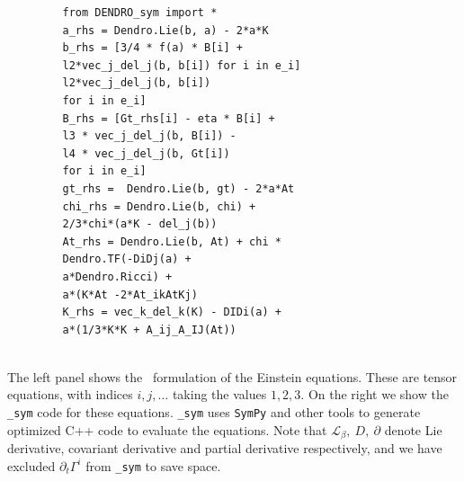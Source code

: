 \documentclass[landscape]{a0poster}
\begin{document}
\begin{textblock}{32}
\begin{textblock}{14.3}
\begin{figure}
\begin{minipage}[t]{.5\textwidth}
\begin{verbatim}
   from DENDRO_sym import *
   a_rhs = Dendro.Lie(b, a) - 2*a*K
   b_rhs = [3/4 * f(a) * B[i] + 
   l2*vec_j_del_j(b, b[i]) for i in e_i]
   l2*vec_j_del_j(b, b[i]) 
   for i in e_i]
   B_rhs = [Gt_rhs[i] - eta * B[i] + 
   l3 * vec_j_del_j(b, B[i]) - 
   l4 * vec_j_del_j(b, Gt[i]) 
   for i in e_i]
   gt_rhs =  Dendro.Lie(b, gt) - 2*a*At
   chi_rhs = Dendro.Lie(b, chi) + 
   2/3*chi*(a*K - del_j(b)) 
   At_rhs = Dendro.Lie(b, At) + chi *
   Dendro.TF(-DiDj(a) + 
   a*Dendro.Ricci) +
   a*(K*At -2*At_ikAtKj)
   K_rhs = vec_k_del_k(K) - DIDi(a) +
   a*(1/3*K*K + A_ij_A_IJ(At)) 
   
\end{verbatim}
\end{minipage}
\vspace{-0.15in}
\end{figure}
The left panel shows the \BSSN ~formulation of the Einstein equations. These are tensor equations, with indices $i,j,\ldots$ taking the values $1, 2, 3$. On the right we show the \texttt{{\dendro\_sym}} code for these equations. \texttt{\dendro\_sym} uses \texttt{SymPy} and other tools to generate optimized C++ code to evaluate the equations. Note that $\mathcal{L}_\beta,\ D,\ \partial$ denote Lie derivative, covariant derivative and partial derivative respectively, and we have excluded $\partial_t\Gamma^i$ from \texttt{\dendro\_sym} to save space.
\end{textblock}



\end{textblock}
\end{document}
